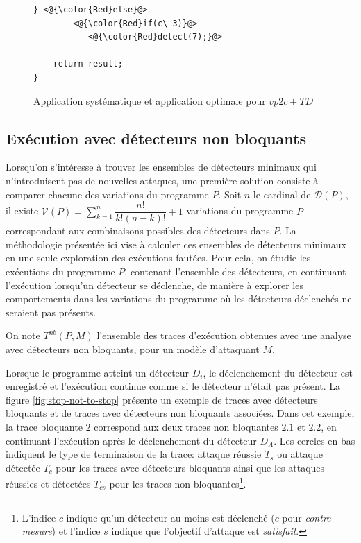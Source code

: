 \begin{figure}[hpt]
\begin{multicols}{2}
\begin{lstlisting}[label=lst:ch6:vp4-compare-res]
    } <@{\color{Red}else}@>
        <@{\color{Red}if(c\_3)}@>
           <@{\color{Red}detect(7);}@>

    return result;
}
\end{lstlisting}  
\end{multicols}
 
        \caption{Application systématique et application optimale pour $vp2c+TD$\label{fig:ch6-vp4-res}}
        \end{figure}

        \subsection{Exécution avec détecteurs non bloquants}
        \label{sec:ch6:nb-exec}

            Lorsqu'on s'intéresse à trouver les ensembles de détecteurs minimaux qui n'introduisent pas de nouvelles attaques, une première solution consiste à comparer chacune des variations du programme $P$. Soit $n$ le cardinal de $\mathcal{D}(P)$, il existe $\mathcal{V}(P) = \sum_{k=1}^{n} \dfrac{n!}{k!(n-k)!} + 1$ variations du programme $P$ correspondant aux combinaisons possibles des détecteurs dans $P$.
            La méthodologie présentée ici vise à calculer ces ensembles de détecteurs minimaux en une seule exploration des exécutions fautées.
            Pour cela, on étudie les exécutions du programme $P$, contenant l'ensemble des détecteurs, en continuant l'exécution lorsqu'un détecteur se déclenche, de manière à explorer les comportements dans les variations du programme où les détecteurs déclenchés ne seraient pas présents.

            \begin{defi}
                \label{def:tnb}
                On note $T^{nb}(P, M)$ l'ensemble des traces d'exécution obtenues avec une analyse avec détecteurs non bloquants, pour un modèle d'attaquant $M$.
            \end{defi}
            
            Lorsque le programme atteint un détecteur $D_i$, le déclenchement du détecteur est enregistré et l'exécution continue comme si le détecteur n'était pas présent.
            La figure \ref{fig:stop-not-to-stop} présente un exemple de traces avec détecteurs bloquants et de traces avec détecteurs non bloquants associées.
            Dans cet exemple, la trace bloquante $2$ correspond aux deux traces non bloquantes $2.1$ et $2.2$, en continuant l'exécution après le déclenchement du détecteur $D_A$. Les cercles en bas indiquent le type de terminaison de la trace: attaque réussie $T_s$ ou attaque détectée $T_c$ pour les traces avec détecteurs bloquants ainsi que les attaques réussies et détectées $T_{cs}$ pour les traces non bloquantes\footnote{L'indice $c$ indique qu'un détecteur au moins est déclenché ($c$ pour \textit{contre-mesure}) et l'indice $s$ indique que l'objectif d'attaque est \textit{satisfait}.}.
            
